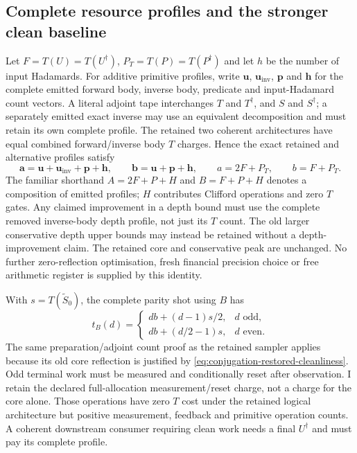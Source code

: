 \documentclass[11pt]{article}
\begin{document}
\subsection{Complete resource profiles and the stronger clean baseline}

Let $F=T(U)=T(U^\dagger)$, $P_T=T(P)=T(P^\dagger)$ and let
$h$ be the number of input Hadamards. For additive primitive profiles,
write $\boldsymbol u$, $\boldsymbol u_{\mathrm{inv}}$,
$\boldsymbol p$ and $\boldsymbol h$ for the complete emitted forward
body, inverse body, predicate and input-Hadamard count vectors.
A literal adjoint tape interchanges $T$ and $T^\dagger$, and $S$ and
$S^\dagger$; a separately emitted exact inverse may use an equivalent
decomposition and must retain its own complete profile. The retained
two coherent architectures have equal combined forward/inverse body
$T$ charges. Hence the exact retained and alternative profiles satisfy
\begin{equation}
 \boldsymbol a=\boldsymbol u+\boldsymbol u_{\mathrm{inv}}
                  +\boldsymbol p+\boldsymbol h,
 \qquad \boldsymbol b=\boldsymbol u+\boldsymbol p+\boldsymbol h,
 \qquad a=2F+P_T,\qquad b=F+P_T.
 \label{eq:conjugation-resource-profiles}
\end{equation}
The familiar shorthand $A=2F+P+H$ and $B=F+P+H$ denotes a
composition of emitted profiles; $H$ contributes Clifford operations
and zero $T$ gates. Any claimed improvement in a depth bound must use
the complete removed inverse-body depth profile, not just its $T$ count.
The old larger conservative depth upper bounds may instead be retained
without a depth-improvement claim. The retained
core and conservative peak are unchanged. No further zero-reflection
optimisation, fresh financial precision choice or free arithmetic
register is supplied by this identity.

With $s=T(\widetilde S_0)$, the complete parity shot using $B$ has
\begin{equation}
 t_B(d)=\begin{cases}
  db+(d-1)s/2,&d\text{ odd},\\
  db+(d/2-1)s,&d\text{ even}.
 \end{cases}
 \label{eq:conjugation-parity-resource}
\end{equation}
The same preparation/adjoint count proof as the retained sampler
applies because its old core reflection is justified by
\eqref{eq:conjugation-restored-cleanliness}. Odd terminal work must be
measured and conditionally reset after observation. I retain the
declared full-allocation measurement/reset charge, not a charge for
the core alone. Those operations have zero $T$ cost under the retained
logical architecture but positive measurement, feedback and primitive
operation counts. A coherent downstream consumer requiring clean work
needs a final $U^\dagger$ and must pay its complete profile.
\end{document}
